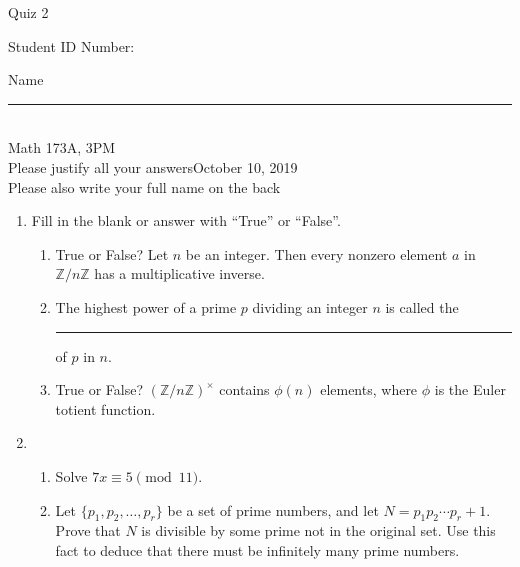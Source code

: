 \documentclass[12pt]{article}
\newcommand{\integers}{\mathbb{Z}}
\begin{document}
\begin{flushleft} 
\centerline{\LARGE{Quiz 2}} 
\vspace{5 mm}
{Student ID Number:}\hfill  
{Name \rule {2 in}{0.01in}}\\
Math 173A, 3PM
\\
{Please justify all your answers}\hfill {October 10, 2019}
\\
{Please also write your full name on the back} 

\medskip
\end{flushleft}

\begin{enumerate}
	\item Fill in the blank or answer with ``True'' or ``False''.
	\begin{enumerate}
		\item True or False? Let $n$ be an integer. Then every nonzero element $a$ in $\integers/n\integers$ has a multiplicative inverse.
		\item The highest power of a prime $p$ dividing an integer $n$ is called the \rule{2.5cm}{.15mm} of $p$ in $n$.
		\item True or False? $(\integers/n\integers)^\times$ contains $\phi(n)$ elements, where $\phi$ is the Euler totient function.
	\end{enumerate}
	\vfill

	\item \begin{enumerate}
		\item Solve $7x \equiv 5 \pmod{11}$.
		\vfill
		\item Let $\{p_1, p_2, \ldots, p_r\}$ be a set of prime numbers, and let $N = p_1p_2\cdots p_r + 1$. Prove that $N$ is divisible by some prime not in the original set. Use this fact to deduce that there must be infinitely many prime numbers.
		\vfill
	\end{enumerate}
\end{enumerate}

\end{document}
